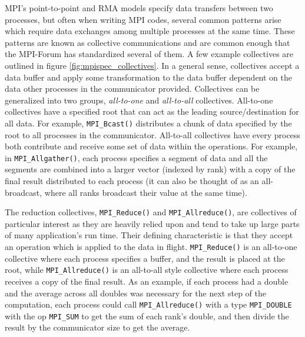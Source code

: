 MPI's point-to-point and RMA models specify data transfers between two processes, but often when writing MPI codes, several common patterns arise which require data exchanges among multiple processes at the same time.
These patterns are known as collective communications and are common enough that the MPI-Forum has standardized several of them.
A few example collectives are outlined in figure \ref{fig:mpispec_collectives}. 
In a general sense, collectives accept a data buffer and apply some transformation to the data buffer dependent on the data other processes in the communicator provided.
Collectives can be generalized into two groups, \textit{all-to-one} and \textit{all-to-all} collectives.
All-to-one collectives have a specified root that can act as the leading source/destination for all data.
For example, \texttt{MPI\_Bcast()} distributes a chunk of data specified by the root to all processes in the communicator.
All-to-all collectives have every process both contribute and receive some set of data within the operations.
For example, in \texttt{MPI\_Allgather()}, each process specifies a segment of data and all the segments are combined into a larger vector (indexed by rank) with a copy of the final result distributed to each process (it can also be thought of as an all-broadcast, where all ranks broadcast their value at the same time).

The reduction collectives, \texttt{MPI\_Reduce()} and \texttt{MPI\_Allreduce()}, are collectives of particular interest as they are heavily relied upon and tend to take up large parts of many application's run time.
Their defining characteristic is that they accept an operation which is applied to the data in flight.
\texttt{MPI\_Reduce()} is an all-to-one collective where each process specifies a buffer, and the result is placed at the root, while \texttt{MPI\_Allreduce()} is an all-to-all style collective where each process receives a copy of the final result. 
As an example, if each process had a double and the average across all doubles was necessary for the next step of the computation, each process could call \texttt{MPI\_Allreduce()} with a type \texttt{MPI\_DOUBLE} with the op \texttt{MPI\_SUM} to get the sum of each rank's double, and then divide the result by the communicator size to get the average.

